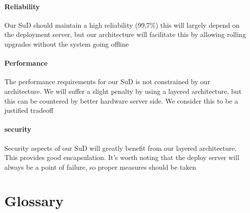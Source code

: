 \documentclass[10pt]{article}
\begin{document}
\subsection{Reliability}
Our SuD should maintain a high reliability (99,7\%) this will largely depend on the deployment server, but our architecture will facilitate this by allowing rolling upgrades without the system going offline

\subsection{Performance}
The performance requirements for our SuD is not constrained by our architecture. We will suffer a slight penalty by using a layered architecture, but this can be countered by better hardware server side. We consider this to be a justified tradeoff

\subsection{security}
Security aspects of our SuD will greatly benefit from our layered architecture. This provides good encapsulation. It's worth noting that the deploy server will always be a point of failure, so proper measures should be taken


\part{Glossary}
\end{document}
